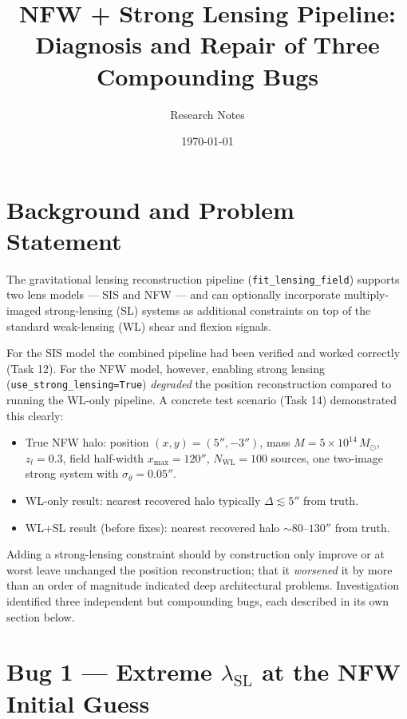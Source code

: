 \documentclass[12pt]{article}
\title{NFW + Strong Lensing Pipeline:\\Diagnosis and Repair of Three Compounding Bugs}
\author{Research Notes}
\date{\today}
\begin{document}
\maketitle

\tableofcontents
\newpage

\section{Background and Problem Statement}

The gravitational lensing reconstruction pipeline (\texttt{fit\_lensing\_field}) supports two
lens models --- SIS and NFW --- and can optionally incorporate multiply-imaged strong-lensing
(SL) systems as additional constraints on top of the standard weak-lensing (WL) shear and
flexion signals.

For the SIS model the combined pipeline had been verified and worked correctly (Task 12).
For the NFW model, however, enabling strong lensing
(\texttt{use\_strong\_lensing=True}) \emph{degraded} the position
reconstruction compared to running the WL-only pipeline.  A concrete test scenario
(Task 14) demonstrated this clearly:

\begin{itemize}
  \item True NFW halo: position $(x,y)=(5'',-3'')$, mass $M = 5\times10^{14}\,M_\odot$,
        $z_l = 0.3$, field half-width $x_\mathrm{max}=120''$, $N_\mathrm{WL}=100$ sources,
        one two-image strong system with $\sigma_\theta = 0.05''$.
  \item WL-only result: nearest recovered halo typically $\Delta \lesssim 5''$ from truth.
  \item WL+SL result (before fixes): nearest recovered halo $\sim 80$--$130''$ from truth.
\end{itemize}

Adding a strong-lensing constraint should by construction only improve or at worst leave
unchanged the position reconstruction; that it \emph{worsened} it by more than an order of
magnitude indicated deep architectural problems.  Investigation identified three independent
but compounding bugs, each described in its own section below.

\section{Bug 1 --- Extreme \texorpdfstring{$\lambda_\mathrm{SL}$}{lambda\_SL} at the NFW Initial Guess}
\label{sec:bug1}
\end{document}
